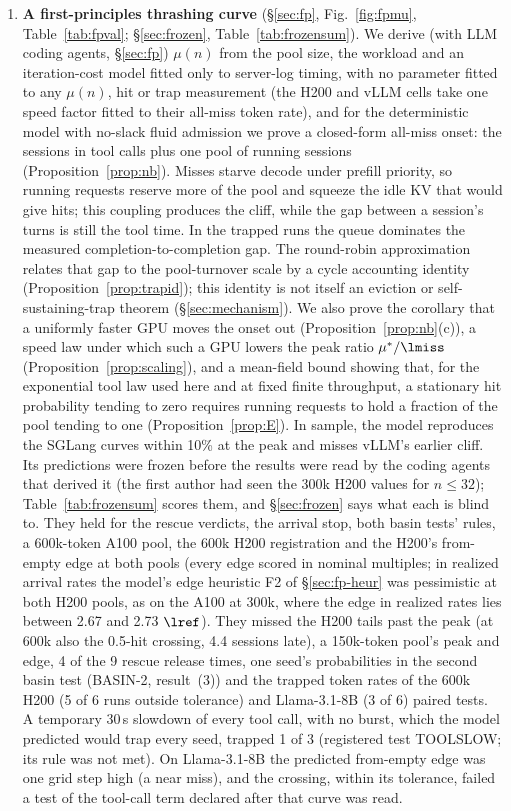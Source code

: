\begin{enumerate}[label=(\arabic*),leftmargin=*]
\item \textbf{A first-principles thrashing curve} (\S\ref{sec:fp}, Fig.~\ref{fig:fpmu}, Table~\ref{tab:fpval}; \S\ref{sec:frozen}, Table~\ref{tab:frozensum}). We derive (with LLM coding agents, \S\ref{sec:fp}) $\mu(n)$ from the pool size, the workload and an iteration-cost model fitted only to server-log timing, with no parameter fitted to any $\mu(n)$, hit or trap measurement (the H200 and vLLM cells take one speed factor fitted to their all-miss token rate), and for the deterministic model with no-slack fluid admission we prove a closed-form all-miss onset: the sessions in tool calls plus one pool of running sessions (Proposition~\ref{prop:nb}). Misses starve decode under prefill priority, so running requests reserve more of the pool and squeeze the idle KV that would give hits; this coupling produces the cliff, while the gap between a session's turns is still the tool time. In the trapped runs the queue dominates the measured completion-to-completion gap. The round-robin approximation relates that gap to the pool-turnover scale by a cycle accounting identity (Proposition~\ref{prop:trapid}); this identity is not itself an eviction or self-sustaining-trap theorem (\S\ref{sec:mechanism}). We also prove the corollary that a uniformly faster GPU moves the onset out (Proposition~\ref{prop:nb}(c)), a speed law under which such a GPU lowers the peak ratio $\mu^*/\lmiss$ (Proposition~\ref{prop:scaling}), and a mean-field bound showing that, for the exponential tool law used here and at fixed finite throughput, a stationary hit probability tending to zero requires running requests to hold a fraction of the pool tending to one (Proposition~\ref{prop:E}). In sample, the model reproduces the SGLang curves within 10\% at the peak and misses vLLM's earlier cliff. Its predictions were frozen before the results were read by the coding agents that derived it (the first author had seen the 300k H200 values for $n\le32$); Table~\ref{tab:frozensum} scores them, and \S\ref{sec:frozen} says what each is blind to. They held for the rescue verdicts, the arrival stop, both basin tests' rules, a 600k-token A100 pool, the 600k H200 registration and the H200's from-empty edge at both pools (every edge scored in nominal multiples; in realized arrival rates the model's edge heuristic F2 of \S\ref{sec:fp-heur} was pessimistic at both H200 pools, as on the A100 at 300k, where the edge in realized rates lies between 2.67 and 2.73 $\lref$). They missed the H200 tails past the peak (at 600k also the 0.5-hit crossing, 4.4 sessions late), a 150k-token pool's peak and edge, 4 of the 9 rescue release times, one seed's probabilities in the second basin test (BASIN-2, result~(3)) and the trapped token rates of the 600k H200 (5 of 6 runs outside tolerance) and Llama-3.1-8B (3 of 6) paired tests. A temporary 30\,s slowdown of every tool call, with no burst, which the model predicted would trap every seed, trapped 1 of 3 (registered test TOOLSLOW; its rule was not met). On Llama-3.1-8B the predicted from-empty edge was one grid step high (a near miss), and the crossing, within its tolerance, failed a test of the tool-call term declared after that curve was read.
\end{enumerate}

